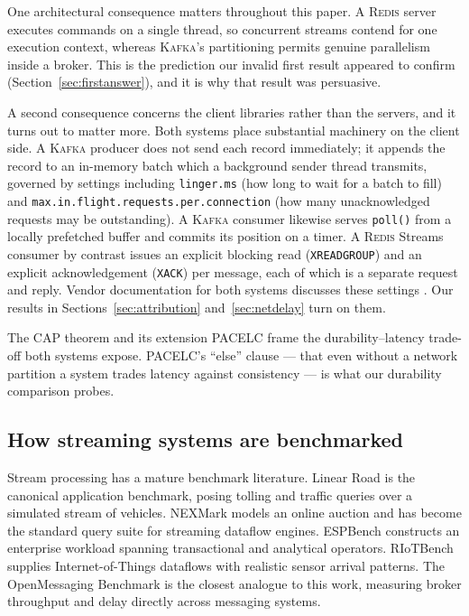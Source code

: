 \documentclass[Afour,sageh,times]{sagej}
\newcommand{\redis}{\textsc{Redis}}
\newcommand{\kafka}{\textsc{Kafka}}
\begin{document}
One architectural consequence matters throughout this paper. A \redis{} server executes commands
on a single thread, so concurrent streams contend for one execution context, whereas \kafka{}'s
partitioning permits genuine parallelism inside a broker. This is the prediction our invalid first
result appeared to confirm (Section~\ref{sec:firstanswer}), and it is why that result was
persuasive.

A second consequence concerns the client libraries rather than the servers, and it turns out to
matter more. Both systems place substantial machinery on the client side. A \kafka{} producer
does not send each record immediately; it appends the record to an in-memory batch which a
background sender thread transmits, governed by settings including \texttt{linger.ms} (how long
to wait for a batch to fill) and \texttt{max.in.flight.requests.per.connection} (how many
unacknowledged requests may be outstanding). A \kafka{} consumer likewise serves \texttt{poll()}
from a locally prefetched buffer and commits its position on a timer. A \redis{} Streams consumer
by contrast issues an explicit blocking read (\texttt{XREADGROUP}) and an explicit acknowledgement
(\texttt{XACK}) per message, each of which is a separate request and reply. Vendor documentation
for both systems discusses these settings
\cite{confluent2025kafka,redis2025performance}. Our results in
Sections~\ref{sec:attribution} and~\ref{sec:netdelay} turn on them.

The CAP theorem \cite{brewer2012cap} and its extension PACELC \cite{abadi2012pacelc} frame the
durability--latency trade-off both systems expose. PACELC's ``else'' clause --- that even without
a network partition a system trades latency against consistency --- is what our durability
comparison probes.

\subsection{How streaming systems are benchmarked}
\label{sec:lit_bench}

Stream processing has a mature benchmark literature. Linear Road \cite{arasu2004linear} is the
canonical application benchmark, posing tolling and traffic queries over a simulated stream of
vehicles. NEXMark \cite{tucker2008nexmark} models an online auction and has become the standard
query suite for streaming dataflow engines. ESPBench \cite{hesse2021espbench} constructs an
enterprise workload spanning transactional and analytical operators. RIoTBench
\cite{shukla2017riotbench} supplies Internet-of-Things dataflows with realistic sensor arrival
patterns. The OpenMessaging Benchmark \cite{openmessaging2018} is the closest analogue to this
work, measuring broker throughput and delay directly across messaging systems.
\end{document}
